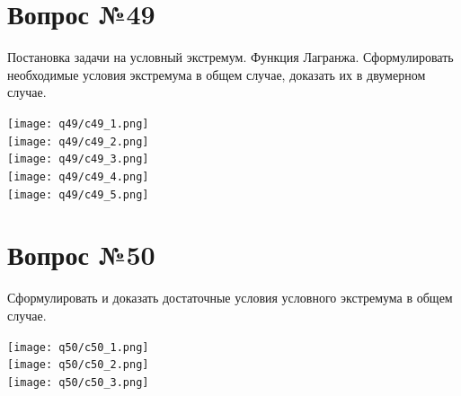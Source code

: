 \documentclass[12pt]{report}
\numberwithin{equation}{section}
\begin{document}
\newpage \section{Вопрос №49} 
\begin{framed}
Постановка задачи на условный экстремум. Функция Лагранжа. Сформулировать необходимые условия экстремума в общем случае, доказать их в двумерном случае.
\end{framed} \begin{center}
\texttt{[image: q49/c49\_1.png]}\\
\texttt{[image: q49/c49\_2.png]}\\
\texttt{[image: q49/c49\_3.png]}\\
\texttt{[image: q49/c49\_4.png]}\\
\texttt{[image: q49/c49\_5.png]}\\
\end{center}




\newpage \section{Вопрос №50} 
\begin{framed}
Сформулировать и доказать достаточные условия условного экстремума в общем случае.
\end{framed}\begin{center}
\texttt{[image: q50/c50\_1.png]}\\
\texttt{[image: q50/c50\_2.png]}\\
\texttt{[image: q50/c50\_3.png]}\\
\end{center}
\end{document}
